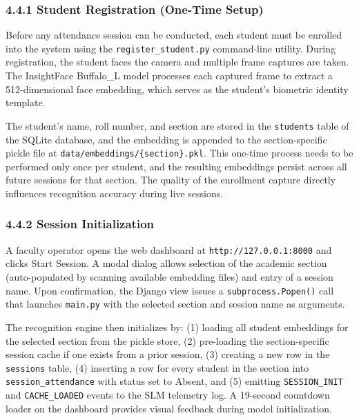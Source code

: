 \documentclass{report}
\begin{document}
\subsubsection*{4.4.1 Student Registration (One-Time Setup)}
\normalsize{
Before any attendance session can be conducted, each student must be enrolled into the system using\vspace{3pt} the \texttt{register\_student.py} command-line utility. During registration, the student faces the camera\vspace{3pt} and multiple frame captures are taken. The InsightFace Buffalo\_L model processes each captured frame\vspace{3pt} to extract a 512-dimensional face embedding, which serves as the student's biometric identity template.

The student's name, roll number, and section are stored in the \texttt{students} table of the SQLite\vspace{3pt} database, and the embedding is appended to the section-specific pickle file at\vspace{3pt} \texttt{data/embeddings/\{section\}.pkl}. This one-time process needs to be performed only once per\vspace{3pt} student, and the resulting embeddings persist across all future sessions for that section. The quality\vspace{3pt} of the enrollment capture directly influences recognition accuracy during live sessions.
}

\subsubsection*{4.4.2 Session Initialization}
\normalsize{
A faculty operator opens the web dashboard at \texttt{http://127.0.0.1:8000} and clicks Start Session.\vspace{3pt} A modal dialog allows selection of the academic section (auto-populated by scanning available\vspace{3pt} embedding files) and entry of a session name. Upon confirmation, the Django view issues a\vspace{3pt} \texttt{subprocess.Popen()} call that launches \texttt{main.py} with the selected section and session name\vspace{3pt} as arguments.

The recognition engine then initializes by: (1) loading all student embeddings for the selected\vspace{3pt} section from the pickle store, (2) pre-loading the section-specific session cache if one exists from\vspace{3pt} a prior session, (3) creating a new row in the \texttt{sessions} table, (4) inserting a row for every\vspace{3pt} student in the section into \texttt{session\_attendance} with status set to Absent, and (5) emitting\vspace{3pt} \texttt{SESSION\_INIT} and \texttt{CACHE\_LOADED} events to the SLM telemetry log. A 19-second countdown\vspace{3pt} loader on the dashboard provides visual feedback during model initialization.
}
\end{document}
